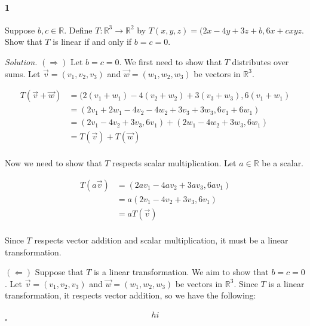 \documentclass[12pt]{article}
\newenvironment{problem}[1]{\paragraph{#1}}{}
\newenvironment{solution}{\textit{Solution.}\:}{\hfill $\square$}
\begin{document}
\begin{problem}{1}
  Suppose $b, c \in \mathbb{R}$. Define $T : \mathbb{R}^3 \to \mathbb{R}^2$ by
  $T(x, y, z) = (2x - 4y + 3z + b, 6x + cxyz$. Show that $T$ is linear if and
  only if $b = c = 0$.
\end{problem}

\begin{solution}
  $(\Rightarrow)$ Let $b = c = 0$. We first need to show that $T$ distributes
  over sums. Let $\vec{v} = (v_1, v_2, v_3)$ and $\vec{w} = (w_1, w_2, w_3)$ be
  vectors in $\mathbb{R}^3$.

  \[
    \begin{split}
      T(\vec{v} + \vec{w}) & = (2(v_1 + w_1) - 4(v_2 + w_2) + 3(v_3 + w_3), 6(v_1 + w_1) \\
                           & = (2v_1 + 2w_1 - 4v_2 - 4w_2 + 3v_3 + 3w_3, 6v_1 + 6w_1)    \\
                           & = (2v_1 - 4v_2 + 3v_3, 6v_1) + (2w_1 - 4w_2 + 3w_3, 6w_1)   \\
                           & = T(\vec{v}) + T(\vec{w})                                   \\
    \end{split}
  \]

  Now we need to show that $T$ respects scalar multiplication. Let $a \in
  \mathbb{R}$ be a scalar.

  \[
    \begin{split}
      T(a\vec{v}) & = (2av_1 - 4av_2 + 3av_3, 6av_1) \\
                  & = a(2v_1 - 4v_2 + 3v_3, 6v_1)    \\
                  & = aT(\vec{v})                    \\
    \end{split}
  \]

  Since $T$ respects vector addition and scalar multiplication, it must be a
  linear transformation.

  $(\Leftarrow)$ Suppose that $T$ is a linear transformation. We aim to show
  that $b = c = 0$. Let $\vec{v} = (v_1, v_2, v_3)$ and $\vec{w} = (w_1, w_2,
  w_3)$ be vectors in $\mathbb{R}^3$. Since $T$ is a linear transformation, it
  respects vector addition, so we have the following:

  \[
    \begin{aligned}
      hi
    \end{aligned}
  \]
\end{solution}
\end{document}

